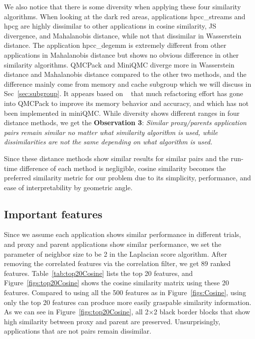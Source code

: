 \documentclass[conference]{IEEEtran}
\begin{document}
We also notice that there is some diversity when applying these four similarity algorithms. When looking at the dark red areas, applications hpcc\_streams and hpcg are highly dissimilar to other applications in cosine similarity, JS divergence, and Mahalanobis distance, while not that dissimilar in Wasserstein distance. The application hpcc\_degemm is extremely different from other applications in Mahalanobis distance but shows no obvious difference in other similarity algorithms. QMCPack and MiniQMC diverge more in Wasserstein distance and Mahalanobis distance compared to the other two methods, and the difference mainly come from memory and cache subgroup which we will discuss in Sec~\ref{sec:subgroup}. It appears based on ~\cite{qmcpack} that much refactoring effort has gone into QMCPack to improve its memory
behavior and accuracy, and which has not been implemented in miniQMC. While diversity shows different ranges in four distance methods, we get the \textbf{Observation 3}: \textit{Similar proxy/parents application pairs remain similar no matter what similarity algorithm is used, while dissimilarities are not the same depending on what algorithm is used.}

Since these distance methods show similar results for similar pairs and the run-time difference of each method is negligible, cosine similarity becomes the preferred similarity metric for our problem due to its simplicity, performance, and ease of interpretability by geometric angle.

\subsection{Important features}
Since we assume each application shows similar performance in different trials, and proxy and parent applications show similar performance, we set the parameter of neighbor size to be 2 in the Laplacian score algorithm. After removing the correlated features via the correlation filter, we get 89 ranked features. Table~\ref{tab:top20Cosine} lists the top 20 features, and Figure~\ref{figs:top20Cosine}  shows the cosine similarity matrix using these 20 features. Compared to using all the 500 features as in Figure~\ref{figs:Cosine}, using only the top 20 features can produce more easily graspable similarity information. As we can see in Figure~\ref{figs:top20Cosine}, all 2$\times$2 black border blocks that show high similarity between proxy and parent are preserved. Unsurprisingly, applications that are not pairs remain dissimilar.%
\end{document}

